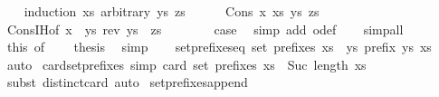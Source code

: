 \begin{isabellebody}
\ \ \isamarkupfalse%
\ {\isacharparenleft}induction\ xs\ arbitrary{\isacharcolon}\ ys\ zs{\isacharparenright}\isanewline
\ \ \ \ \isamarkupfalse%
\ {\isacharparenleft}Cons\ x\ xs\ ys\ zs{\isacharparenright}\isanewline
\ \ \ \ \isamarkupfalse%
\ Cons{\isachardot}IH{\isacharbrackleft}of\ {\isachardoublequoteopen}x\ {\isacharhash}\ ys{\isachardoublequoteclose}\ {\isachardoublequoteopen}rev\ ys\ {\isacharhash}\ zs{\isachardoublequoteclose}{\isacharbrackright}\isanewline
\ \ \ \ \ \ \isamarkupfalse%
\ {\isacharquery}case\ \isamarkupfalse%
\ {\isacharparenleft}simp\ add{\isacharcolon}\ o{\isacharunderscore}def{\isacharparenright}\isanewline
\ \ \isamarkupfalse%
\ simp{\isacharunderscore}all\isanewline
\ \ \isamarkupfalse%
\ this\ {\isacharbrackleft}of\ {\isachardoublequoteopen}{\isacharbrackleft}{\isacharbrackright}{\isachardoublequoteclose}\ {\isachardoublequoteopen}{\isacharbrackleft}{\isacharbrackright}{\isachardoublequoteclose}{\isacharbrackright}\ \isamarkupfalse%
\ {\isacharquery}thesis\ \isamarkupfalse%
\ simp\isanewline
{}\isamarkupfalse%
%
\endisatagproof
{\isafoldproof}%
%
\isadelimproof
\isanewline
%
\endisadelimproof
\ \ \isanewline
{}\isamarkupfalse%
\ set{\isacharunderscore}prefixes{\isacharunderscore}eq{\isacharcolon}\ {\isachardoublequoteopen}set\ {\isacharparenleft}prefixes\ xs{\isacharparenright}\ {\isacharequal}\ {\isacharbraceleft}ys{\isachardot}\ prefix\ ys\ xs{\isacharbraceright}{\isachardoublequoteclose}\isanewline
%
\isadelimproof
\ \ %
\endisadelimproof
%
\isatagproof
{}\isamarkupfalse%
\ auto%
\endisatagproof
{\isafoldproof}%
%
\isadelimproof
\isanewline
%
\endisadelimproof
\isanewline
{}\isamarkupfalse%
\ card{\isacharunderscore}set{\isacharunderscore}prefixes\ {\isacharbrackleft}simp{\isacharbrackright}{\isacharcolon}\ {\isachardoublequoteopen}card\ {\isacharparenleft}set\ {\isacharparenleft}prefixes\ xs{\isacharparenright}{\isacharparenright}\ {\isacharequal}\ Suc\ {\isacharparenleft}length\ xs{\isacharparenright}{\isachardoublequoteclose}\isanewline
%
\isadelimproof
\ \ %
\endisadelimproof
%
\isatagproof
{}\isamarkupfalse%
\ {\isacharparenleft}subst\ distinct{\isacharunderscore}card{\isacharparenright}\ auto%
\endisatagproof
{\isafoldproof}%
%
\isadelimproof
\isanewline
%
\endisadelimproof
\isanewline
{}\isamarkupfalse%
\ set{\isacharunderscore}prefixes{\isacharunderscore}append{\isacharcolon}\ \isanewline

\end{isabellebody}
